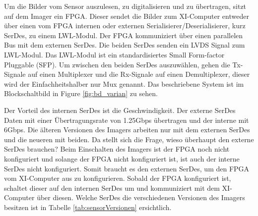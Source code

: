 \documentclass{article}
\begin{document}
Um die Bilder vom Sensor auszulesen, zu digitalisieren und zu übertragen, sitzt auf dem Imager ein FPGA. Dieser sendet die Bilder zum XI-Computer entweder über einen vom FPGA internen oder externen Serialisierer/Deserialisierer, kurz SerDes, zu einem LWL-Modul. Der FPGA kommuniziert über einen parallelen Bus mit dem externen SerDes. Die beiden SerDes senden ein LVDS Signal zum LWL-Modul. Das LWL-Modul ist ein standardisiertes Small Form-factor Pluggable (SFP). Um zwischen den beiden SerDes auszuwählen, gehen die Tx-Signale auf einen Multiplexer und die Rx-Signale auf einen Demultiplexer, dieser wird der Einfachheitshalber nur Mux genannt. Das beschriebene System ist im Blockschaltbild in Figure \ref{fig:bd_varian} zu sehen.

Der Vorteil des internen SerDes ist die Geschwindigkeit. Der externe SerDes Daten mit einer Übertragungsrate von 1.25Gbps übertragen und der interne mit 6Gbps. Die älteren Versionen des Imagers arbeiten nur mit dem externen SerDes und die neueren mit beiden. Da stellt sich die Frage, wieso überhaupt den externe SerDes brauchen? Beim Einschalten des Imagers ist der FPGA noch nicht konfiguriert und solange der FPGA nicht konfiguriert ist, ist auch der interne SerDes nicht konfiguriert. Somit braucht es den externen SerDes, um den FPGA vom XI-Computer aus zu konfigurieren. Sobald der FPGA konfiguriert ist, schaltet dieser auf den internen SerDes um und kommuniziert mit dem XI-Computer über diesen. Welche SerDes die verschiedenen Versionen des Imagers besitzen ist in Tabelle \ref{tab:sensorVersionen} ersichtlich.

\end{document}

